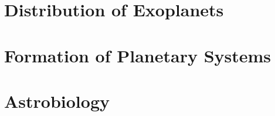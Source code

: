 \documentclass{momento}
\begin{document}


\onecolumn
\chapter{Distribution of Exoplanets}
\label{cha:distr-exopl}

\twocolumn

\chapter{Formation of Planetary Systems}
\label{cha:form-plan-syst}


\chapter{Astrobiology}
\label{cha:astrobiology}



\appendices




\nocite{*}
\end{document}
